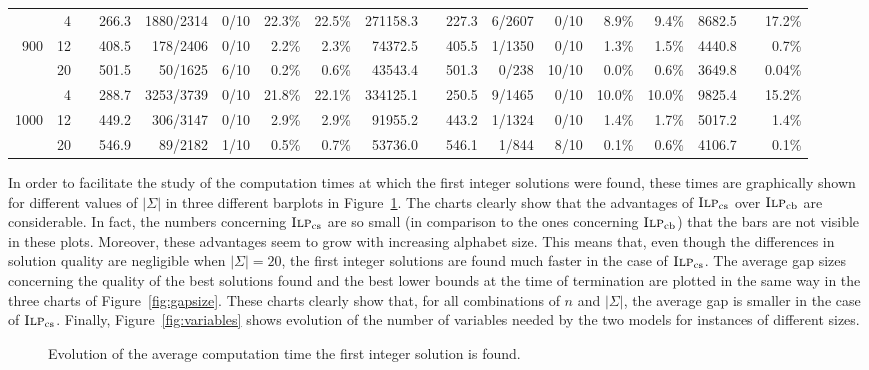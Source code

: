 \documentclass[11pt,a4paper]{article}
\newcommand{\MIPorig}{\textsc{Ilp}_{\mathrm{cb}}}
\newcommand{\MIPalt}{\textsc{Ilp}_{\mathrm{cs}}}
\newcommand{\ccg}{\cellcolor{lightgray}}
\begin{document}
\begin{sidewaystable}
{\begin{tabular}{rr r rrrrr r rrrrrrrrr}
     & 4  &&  266.3 & 1880/2314   &    0/10   & 22.3\% & 22.5\% & 271158.3   && \ccg227.3   & 6/2607     & 0/10  &  8.9\%  & 9.4\%  & 8682.5 && 17.2\% \\
900  & 12 &&  408.5 & 178/2406	  &    0/10   & 2.2\%  & 2.3\%  & 74372.5    &&	  \ccg405.5 & 1/1350	 & 0/10  &  1.3\%  & 1.5\%  & 4440.8 && 0.7\% \\
     & 20 &&  501.5 & 50/1625	  &    6/10   & 0.2\%  & 0.6\%  & 43543.4    &&	  \ccg501.3 & 0/238	 & 10/10 &  0.0\%  & 0.6\%  & 3649.8 && 0.04\% \\ \hline
     & 4  &&  288.7 & 3253/3739   &    0/10   & 21.8\% & 22.1\% & 334125.1   &&	  \ccg250.5 & 9/1465     & 0/10  &  10.0\% & 10.0\% & 9825.4 && 15.2\% \\
1000 & 12 &&  449.2 & 306/3147	  &    0/10   & 2.9\%  & 2.9\%  & 91955.2    &&	  \ccg443.2 & 1/1324	 & 0/10  &  1.4\%  & 1.7\%  & 5017.2 && 1.4\% \\
     & 20 &&  546.9 & 89/2182	  &    1/10   & 0.5\%  & 0.7\%  & 53736.0    &&	  \ccg546.1 & 1/844	 & 8/10  &  0.1\%  & 0.6\%  & 4106.7 && 0.1\% \\
\hline\hline
\end{tabular}}
\end{sidewaystable}

In order to facilitate the study of the computation times at which the first integer solutions were found, these times are graphically shown for different values of $|\Sigma|$ in three different barplots in Figure~\ref{fig:firstsoltime}. The charts clearly show that the advantages of $\MIPalt$ over $\MIPorig$ are considerable. In fact, the numbers concerning $\MIPalt$ are so small (in comparison to the ones concerning $\MIPorig$) that the bars are not visible in these plots. Moreover, these advantages seem to grow with increasing alphabet size. This means that, even though the differences in solution quality are negligible when $|\Sigma| = 20$, the first integer solutions are found much faster in the case of $\MIPalt$. The average gap sizes concerning the quality of the best solutions found and the best lower bounds at the time of termination are plotted in the same way in the three charts of Figure~\ref{fig:gapsize}. These charts clearly show that, for all combinations of $n$ and $|\Sigma|$, the average gap is smaller in the case of $\MIPalt$. Finally, Figure~\ref{fig:variables} shows evolution of the number of variables needed by the two models for instances of different sizes. 

\begin{figure}[!t]
\centering
{}
\caption{Evolution of the average computation time the first integer solution is found.}
\label{fig:firstsoltime}
\end{figure}
\end{document}
